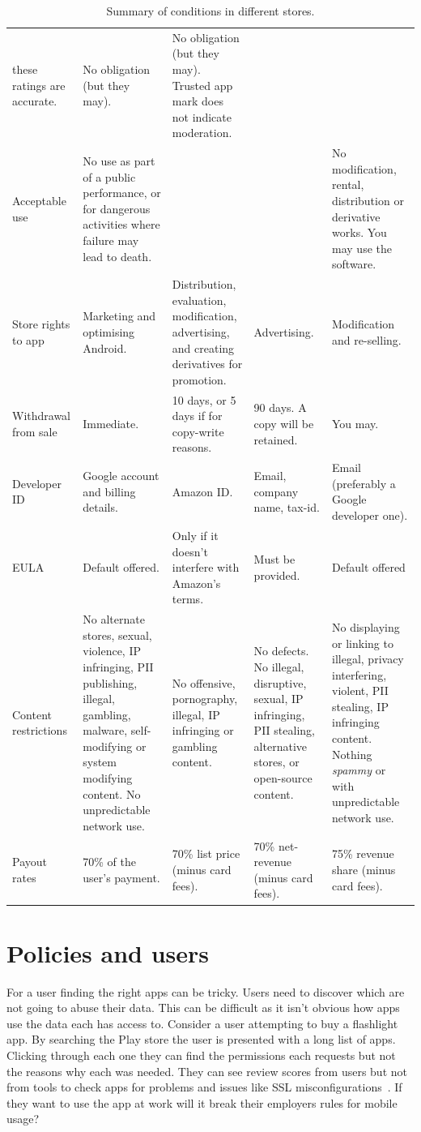 \documentclass[thesis.tex]{subfiles}
\begin{document}
\begin{table}
\begin{tabulary}{\linewidth}{lLLLL}
    these ratings are accurate. & No obligation (but they may). & No
    obligation (but they may). Trusted app mark does not indicate
    moderation.\\
    Acceptable use & No use as part of a public performance, or for
    dangerous activities where failure may lead to death. & & & No
    modification, rental, distribution or derivative works. You may use the
    software.\\
    Store rights to app & Marketing and optimising Android. & Distribution,
    evaluation, modification, advertising, and creating derivatives for
    promotion. & Advertising. & Modification and re-selling.\\
    Withdrawal from sale & Immediate. & 10 days, or 5 days if for copy-write
    reasons. & 90 days. A copy will be retained. & You may.\\
    Developer ID & Google account and billing details. & Amazon ID. & Email,
    company name, tax-id. & Email (preferably a Google developer
    one).\\
    EULA & Default offered. & Only if it doesn't interfere with Amazon's
    terms. & Must be provided. & Default offered\\
    Content restrictions & No alternate stores, sexual, violence, IP
    infringing, PII publishing, illegal, gambling, malware, self-modifying
    or system modifying content. No unpredictable network use. & No
    offensive, pornography, illegal, IP infringing or gambling content. & No
    defects. No illegal, disruptive, sexual, IP infringing, PII stealing,
    alternative stores, or open-source content. & No displaying or linking
    to illegal, privacy interfering, violent, PII stealing, IP infringing
    content. Nothing \emph{spammy} or with unpredictable network
    use.\\
    Payout rates & 70\% of the user's payment. & 70\% list price (minus card
    fees). & 70\% net-revenue (minus card fees). & 75\% revenue share (minus
    card fees).\\
    \bottomrule
  \end{tabulary}
  \label{tab:store-tandcs}
  \caption{Summary of conditions in different stores.}
\end{table}

\section{Policies and users}

For a user finding the right apps can be tricky.
Users need to discover which are not going to abuse their data.
This can be difficult as it isn't obvious how apps use the data each has access to.
Consider a user attempting to buy a flashlight app.
By searching the Play store the user is presented with a long list of apps.
Clicking through each one they can find the permissions each requests but not the reasons why each was needed.
They can see review scores from users but not from tools to check apps for problems and issues like SSL misconfigurations~\cite{fahl_why_2012}.
If they want to use the app at work will it break their employers rules for mobile usage?
\end{document}
